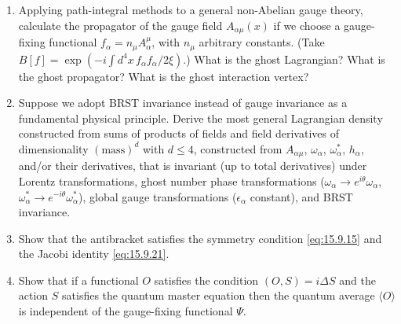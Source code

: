 \begin{enumerate}
  \item Applying path-integral methods to a general non-Abelian gauge theory, calculate the propagator of the gauge field $A_{\alpha\mu}(x)$ if we choose a gauge-fixing functional $f_\alpha=n_\mu A_\alpha^\mu$, with $n_\mu$ arbitrary constants. (Take $B[f]=\exp(-i\int d^4x\,f_\alpha f_\alpha/2\xi)$.) What is the ghost Lagrangian? What is the ghost propagator? What is the ghost interaction vertex?

  \item Suppose we adopt BRST invariance instead of gauge invariance as a fundamental physical principle. Derive the most general Lagrangian density constructed from sums of products of fields and field derivatives of dimensionality $(\text{mass})^d$ with $d\leq4$, constructed from $A_{\alpha\mu}$, $\omega_\alpha$, $\omega_\alpha^*$, $h_\alpha$, and/or their derivatives, that is invariant (up to total derivatives) under Lorentz transformations, ghost number phase transformations ($\omega_\alpha\longrightarrow e^{i\theta}\omega_\alpha$, $\omega_\alpha^*\longrightarrow e^{-i\theta}\omega_\alpha^*$), global gauge transformations ($\epsilon_\alpha$ constant), and BRST invariance.

  \item Show that the antibracket satisfies the symmetry condition \eqref{eq:15.9.15} and the Jacobi identity \eqref{eq:15.9.21}.

  \item Show that if a functional $O$ satisfies the condition $(O,S)=i\Delta S$ and the action $S$ satisfies the quantum master equation then the quantum average $\langle O\rangle$ is independent of the gauge-fixing functional $\Psi$.
\end{enumerate}


